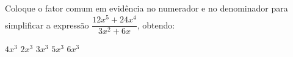 Coloque o fator comum em evidência no numerador e no denominador para simplificar a expressão $\dfrac{12x^5+24x^4}{3x^2+6x}$, obtendo:

$4x^3$
$2x^3$
$3x^3$
$5x^3$
$6x^3$


